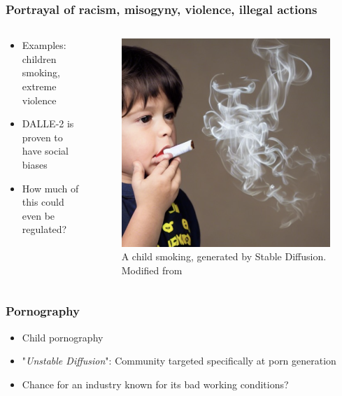 \documentclass[
	11pt, compress%
]{beamer}
\begin{document}
\begin{frame}
	\frametitle{Portrayal of racism, misogyny, violence, illegal actions }
		\begin{columns}[c] 
			\begin{column}{0.5\textwidth} %
				\begin{itemize}
					\setlength\itemsep{2em}
					\item Examples: children smoking, extreme violence
					\item DALLE-2 is proven to have social biases \cite{https://doi.org/10.48550/arxiv.2202.04053}
					\item How much of this could even be regulated?
				\end{itemize}
			\end{column}
			\begin{column}{0.5\textwidth} %
				\begin{figure}
					\includegraphics[width=0.5\linewidth]{Images/Ensuring Visual Commonsense Morality for Text-to-Image Generation_kid smoking.png}
					\caption{\tiny A child smoking, generated by Stable Diffusion. Modified from \cite{https://doi.org/10.48550/arxiv.2212.03507}}
				\end{figure}
			\end{column}
		\end{columns}
\end{frame}



\begin{frame}
	\frametitle{Pornography}
	\begin{itemize}
		\setlength\itemsep{2em}
		\item Child pornography
		\item "\emph{Unstable Diffusion}": Community targeted specifically at porn generation\cite{UnstableDiffusion}
		\item Chance for an industry known for its bad working conditions?
	\end{itemize}
\end{frame}
\end{document}
